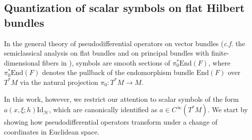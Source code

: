 \documentclass[11pt,oneside,reqno]{amsart}
\newcommand\R{\ensuremath{\mathbb{R}}}
\theoremstyle{definition}
\numberwithin{equation}{section}
\theoremstyle{plain}
\begin{document}

 



\subsection{Quantization of scalar symbols on flat Hilbert bundles}\label{subsec:quansymb}


In the general theory of pseudodifferential operators on vector bundles (\emph{c.f.} the semiclassical analysis on flat bundles and on principal bundles with finite-dimensional fibers in \cite{mama2024semiclassical,cekiclefeuvre2024semiclassical}), symbols are smooth sections of $\pi_0^{*}\mathrm{End}(F)$, where $\pi_0^{*}\mathrm{End}(F)$ denotes the pullback of the endomorphism bundle $\mathrm{End}(F)$ over $T^*M$ via the natural projection $\pi_{0}: T^*M \to M$. 

In this work, however, we restrict our attention to scalar symbols of the form $a(x,\xi;h)\mathrm{Id}_{\mathcal{H}}$, which are canonically identified as $a \in C^{\infty}(T^*M)$. We start by showing how pseudodifferential operators transform under a change of coordinates in Euclidean space.

\end{document}
